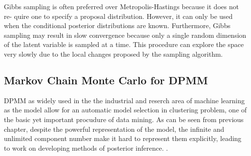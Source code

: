 \begin{itemize}
		 Gibbs sampling is often preferred over Metropolis-Hastings because it does not re-
		 quire one to specify a proposal distribution. However, it can only be used when the
		 conditional posterior distributions are known. Furthermore, Gibbs sampling may result in slow convergence because only a single random dimension of the latent variable is sampled at a time. This procedure can explore the space very slowly due to the local changes proposed by the sampling algorithm.
		 
	\end{itemize}
	
	\subsection{Markov Chain Monte Carlo for DPMM}
	 DPMM as widely used in the the industrial and reserch area of machine learning as the model allow for an automatic model selection in clustering problem, one of the basic yet important procudure of data mining. As can be seen from previous chapter, despite the powerful representation of the model, the infinite and unlimited component number make it hard to represent them explicitly, leading to work on developing methods of posterior inference. . 
	 
